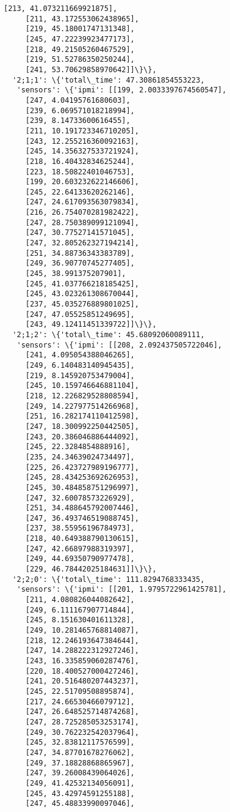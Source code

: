 \documentclass[11pt]{article}
\begin{document}
\begin{tcolorbox}[breakable, size=fbox, boxrule=.5pt, pad at break*=1mm, opacityfill=0]
\begin{Verbatim}[commandchars=\\\{\}]
     [213, 41.073211669921875],
     [211, 43.172553062438965],
     [219, 45.18001747131348],
     [245, 47.22239923477173],
     [218, 49.21505260467529],
     [219, 51.52786350250244],
     [241, 53.70629858970642]]\}\},
  '2;1;1': \{'total\_time': 47.30861854553223,
   'sensors': \{'ipmi': [[199, 2.0033397674560547],
     [247, 4.04195761680603],
     [239, 6.069571018218994],
     [239, 8.14733600616455],
     [211, 10.191723346710205],
     [243, 12.255216360092163],
     [245, 14.356327533721924],
     [218, 16.40432834625244],
     [223, 18.50822401046753],
     [199, 20.603232622146606],
     [245, 22.64133620262146],
     [247, 24.617093563079834],
     [216, 26.754070281982422],
     [247, 28.750389099121094],
     [247, 30.77527141571045],
     [247, 32.805262327194214],
     [251, 34.88736343383789],
     [249, 36.90770745277405],
     [245, 38.991375207901],
     [245, 41.037766218185425],
     [245, 43.023261308670044],
     [237, 45.035276889801025],
     [247, 47.05525851249695],
     [243, 49.12411451339722]]\}\},
  '2;1;2': \{'total\_time': 45.68092060089111,
   'sensors': \{'ipmi': [[208, 2.092437505722046],
     [241, 4.095054388046265],
     [249, 6.140483140945435],
     [219, 8.145920753479004],
     [245, 10.159746646881104],
     [218, 12.226829528808594],
     [249, 14.227977514266968],
     [251, 16.282174110412598],
     [247, 18.300992250442505],
     [243, 20.386046886444092],
     [245, 22.3284854888916],
     [235, 24.34639024734497],
     [225, 26.423727989196777],
     [245, 28.434253692626953],
     [245, 30.484858751296997],
     [247, 32.60078573226929],
     [251, 34.488645792007446],
     [247, 36.493746519088745],
     [237, 38.55956196784973],
     [218, 40.649388790130615],
     [247, 42.66897988319397],
     [249, 44.69350790977478],
     [229, 46.78442025184631]]\}\},
  '2;2;0': \{'total\_time': 111.8294768333435,
   'sensors': \{'ipmi': [[201, 1.9795722961425781],
     [211, 4.080826044082642],
     [249, 6.111167907714844],
     [245, 8.151630401611328],
     [249, 10.281465768814087],
     [218, 12.246193647384644],
     [247, 14.288222312927246],
     [243, 16.335859060287476],
     [220, 18.400527000427246],
     [241, 20.516480207443237],
     [245, 22.51709508895874],
     [217, 24.66530466079712],
     [247, 26.648525714874268],
     [247, 28.725285053253174],
     [249, 30.762232542037964],
     [245, 32.83812117576599],
     [247, 34.87701678276062],
     [249, 37.18828868865967],
     [247, 39.26008439064026],
     [249, 41.42532134056091],
     [245, 43.42974591255188],
     [247, 45.48833990097046],

\end{Verbatim}
\end{tcolorbox}
\end{document}
